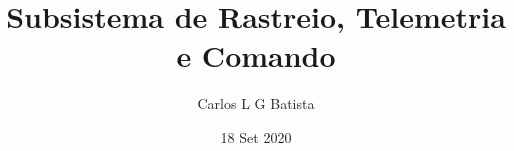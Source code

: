 \documentclass{systems-doc}
\author{%
    Carlos L G Batista
}%
\title{Subsistema de Rastreio, Telemetria e Comando}
\date{18 Set 2020}
\begin{document}
\maketitle

\makeversion

\tableofcontents

\justify





% 


\appendix


% 
% 
\end{document}
